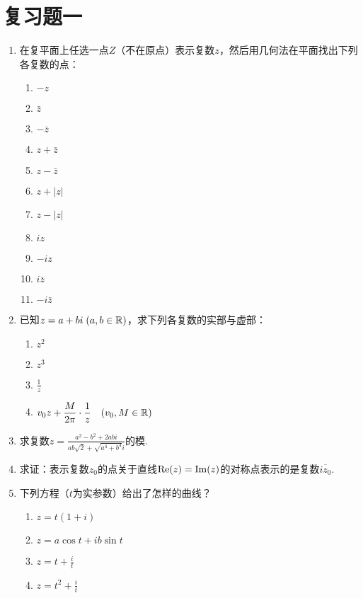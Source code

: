 \section*{复习题一}
\begin{enumerate}
    \item 在复平面上任选一点$Z$（不在原点）表示复数$z$，然后用几何法在平面找出下列各复数的点：
\begin{multicols}{4}
\begin{enumerate}[(1)]
    \item $-z$
    \item $\bar z$
    \item $-\bar z$
    \item $z+\bar z$
    \item $z-\bar z$
    \item $z+|z|$
    \item $z-|z|$
    \item $iz$
    \item $-iz$
    \item $i\bar z$
    \item $-i\bar z$
\end{enumerate}
\end{multicols}

\item 已知$z=a+bi\; (a,b\in\mathbb{R})$，求下列各复数的实部与虚部：
\begin{multicols}{2}
\begin{enumerate}[(1)]
    \item $z^2$
    \item $z^3$
    \item $\frac{1}{z}$
    \item $v_0 z+\dfrac{M}{2\pi}\cdot \dfrac{1}{z}\quad (v_0,M\in\mathbb{R})$
\end{enumerate}
\end{multicols}

\item 求复数$z=\frac{a^2-b^2+2abi}{ab\sqrt{2}+\sqrt{a^4+b^4}i}$的模.

\item 求证：表示复数$z_0$的点关于直线${\rm Re}(z)={\rm Im}(z)$的对称点表示的是复数$\overline{i z_0}$.

\item 下列方程（$t$为实参数）给出了怎样的曲线？
\begin{multicols}{2}
\begin{enumerate}[(1)]
    \item $z=t(1+i)$
    \item $z=a\cos t+ib\sin t$
    \item $z=t+\frac{i}{t}$
    \item $z=t^2+\frac{i}{t}$
\end{enumerate}
\end{multicols}


\end{enumerate}
